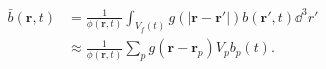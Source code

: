 \begin{equation}
\begin{align*}
\bar{b}(\mathbf{r},t) &= \frac{1}{\phi(\mathbf{r},t)} \int_{V_f(t)}{
g(|\mathbf{r} - \mathbf{r'}|) b(\mathbf{r'},t) \dd^3 r'} \\
& \approx
\frac{1}{\phi(\mathbf{r},t)} \sum_{p}{g(\mathbf{r} - \mathbf{r}_p)
V_p b_p(t)}.
\end{align*}
 \label{eq:b}
\end{equation}
